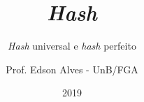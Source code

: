 \title{\textit{Hash}}
\subtitle{\textit{Hash} universal e \textit{hash} perfeito}
\author{Prof. Edson Alves - UnB/FGA}
\date{2019}
